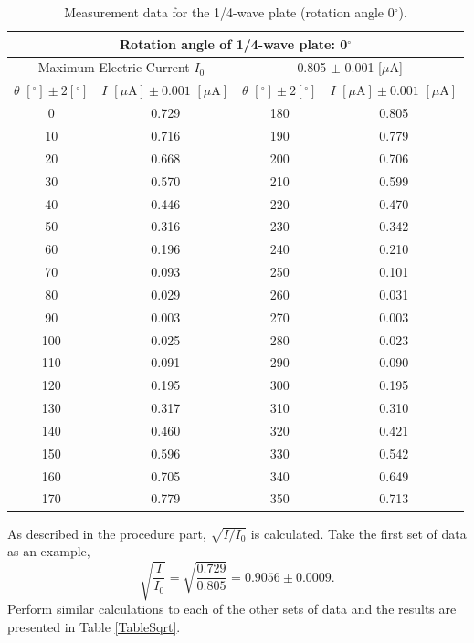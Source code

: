 \documentclass{article}
\begin{document}
\begin{table}[H]\centering
\begin{tabular}{cc||cc}
\multicolumn{4}{c}{Rotation angle of 1/4-wave plate: 0$^\circ$}\\
\toprule
\multicolumn{2}{c}{Maximum Electric Current $I_0$} & \multicolumn{2}{c}{0.805 $\pm$ 0.001 [$\mu$A]}\\
\midrule
$\theta\,\,[^\circ] \pm 2[^\circ]$ & $I\,\,[\mu\text{A}] \pm 0.001\,\,[\mu\text{A}]$ & $\theta\,\,[^\circ] \pm 2[^\circ]$ & $I\,\,[\mu\text{A}] \pm 0.001\,\,[\mu\text{A}]$\\
\midrule
    0     & 0.729  & 180   & 0.805   \\
    10    & 0.716  & 190   & 0.779   \\
    20    & 0.668  & 200   & 0.706   \\
    30    & 0.570  & 210   & 0.599   \\
    40    & 0.446  & 220   & 0.470   \\
    50    & 0.316  & 230   & 0.342   \\
    60    & 0.196  & 240   & 0.210   \\
    70    & 0.093  & 250   & 0.101   \\
    80    & 0.029  & 260   & 0.031   \\
    90    & 0.003  & 270   & 0.003   \\
    100   & 0.025  & 280   & 0.023   \\
    110   & 0.091  & 290   & 0.090   \\
    120   & 0.195  & 300   & 0.195   \\
    130   & 0.317  & 310   & 0.310   \\
    140   & 0.460  & 320   & 0.421   \\
    150   & 0.596  & 330   & 0.542   \\
    160   & 0.705  & 340   & 0.649   \\
    170   & 0.779  & 350   & 0.713   \\
\bottomrule
\end{tabular}
\caption{Measurement data for the 1/4-wave plate (rotation angle 0$^\circ$).}\label{Table1/40}
\end{table}

As described in the procedure part, $\sqrt{I/I_0}$ is calculated. Take the first set of data as an example,
$$\sqrt{\frac{I}{I_0}} = \sqrt{\frac{0.729}{0.805}} = 0.9056 \pm 0.0009.$$
Perform similar calculations to each of the other sets of data and the results are presented in Table \ref{TableSqrt}.
\end{document}
